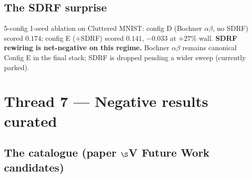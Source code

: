 \documentclass[11pt,a4paper]{article}
\begin{document}
\subsection{The SDRF surprise}

5-config 1-seed ablation on Cluttered MNIST: config D (Bochner $\alpha\beta$,
no SDRF) scored $\mathbf{0.174}$; config E ($+$SDRF) scored $0.141$, $-0.033$ at
$+27\%$ wall. \textbf{SDRF rewiring is net-negative on this regime.} Bochner $\alpha\beta$
remains canonical Config E in the final stack; SDRF is dropped pending a wider
sweep (currently parked).

\section{Thread 7 --- Negative results curated}

\subsection{The catalogue (paper $\S$V Future Work candidates)}
\end{document}
